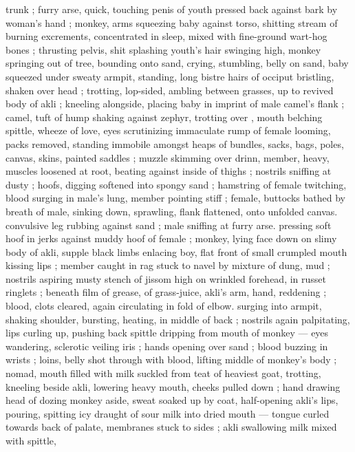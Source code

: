 trunk ; furry arse, quick, touching penis of youth pressed back 
against bark by woman's hand ; monkey, arms squeezing baby 
against torso, shitting stream of burning excrements, concentrated 
in sleep, mixed with fine-ground wart-hog bones ; thrusting pelvis, 
shit splashing youth's hair swinging high, monkey springing out of 
tree, bounding onto sand, crying, stumbling, belly on sand, baby 
squeezed under sweaty armpit, standing, long bistre hairs of occiput 
bristling, shaken over head ; trotting, lop-sided, ambling between 
grasses, up to revived body of akli ; kneeling alongside, placing baby 
in imprint of male camel's flank ; camel, tuft of hump shaking against 
zephyr, trotting over , mouth belching spittle, wheeze of love, 
eyes scrutinizing immaculate rump of female looming, packs 
removed, standing immobile amongst heaps of bundles, sacks, bags, 
poles, canvas, skins, painted saddles ; muzzle skimming over drinn, 
member, heavy, muscles loosened at root, beating against inside of 
thighs ; nostrils sniffing at dusty  ; hoofs, digging softened into 
spongy sand ; hamstring of female twitching, blood surging in male's 
lung, member pointing stiff ; female, buttocks bathed by breath of 
male, sinking down, sprawling, flank flattened, onto unfolded canvas. 
convulsive leg rubbing against sand ; male sniffing at furry arse. 
pressing soft hoof in jerks against muddy hoof of female ; monkey, 
lying face down on slimy body of akli, supple black limbs enlacing 
boy, flat front of small crumpled mouth kissing lips ; member caught 
in rag stuck to navel by mixture of dung, mud ; nostrils aspiring 
musty stench of jissom high on wrinkled forehead, in russet ringlets 
; beneath film of grease, of grass-juice, akli's arm, hand, reddening 
; blood, clots cleared, again circulating in fold of elbow. surging into 
armpit, shaking shoulder, bursting, heating, in middle of back ; 
nostrils again palpitating, lips curling up, pushing back spittle 
dripping from mouth of monkey --- eyes wandering, sclerotic veiling 
iris ; hands opening over sand ; blood buzzing in wrists ; loins, belly 
shot through with blood, lifting middle of monkey's body ; nomad, 
mouth filled with milk suckled from teat of heaviest goat, trotting, 
kneeling beside akli, lowering heavy mouth, cheeks pulled down ; 
hand drawing head of dozing monkey aside, sweat soaked up by 
coat, half-opening akli's lips, pouring, spitting icy draught of sour 
milk into dried mouth --- tongue curled towards back of palate, 
membranes stuck to sides ; akli swallowing milk mixed with spittle, 
